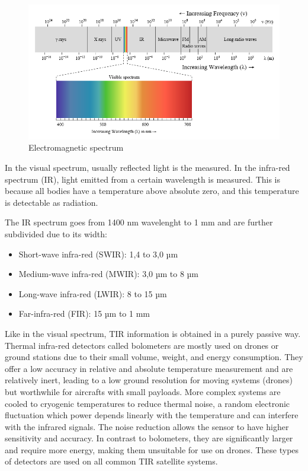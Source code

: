     \begin{figure}[H]
        \centering
        \includegraphics[width=\textwidth]{Includes/1-electromagnetic-spectrum.png}
        \caption{Electromagnetic spectrum}
        \label{fig:1-electromagnetic-spectrum}
    \end{figure}

    In the visual spectrum, usually reflected light is the measured. 
    In the infra-red spectrum (IR), light emitted from a certain wavelength is measured.
    This is because all bodies have a temperature above absolute zero, and this temperature is detectable as radiation.

    The IR spectrum goes from 1400 nm wavelenght to 1 mm and are further subdivided due to its width:


    \begin{itemize}
        \item  Short-wave infra-red (SWIR): 1,4 to 3,0 µm
        \item  Medium-wave infra-red (MWIR): 3,0 µm to 8 µm
        \item Long-wave infra-red (LWIR): 8 to 15 µm
        \item Far-infra-red (FIR): 15 µm to 1 mm
    \end{itemize}
    
    Like in the visual spectrum, TIR information is obtained in a purely passive way.
    Thermal infra-red detectors called bolometers are mostly used on drones or ground stations due to their small volume, weight, and energy consumption. 
    They offer a low accuracy in relative and absolute temperature measurement and are relatively inert, leading to a low ground resolution for moving systems (drones) but worthwhile for aircrafts with small payloads.     
    More complex systems are cooled to cryogenic temperatures to reduce thermal noise, a random electronic fluctuation which power depends linearly with the temperature and can interfere with the infrared signals. The noise reduction allows the sensor to have higher sensitivity and accuracy.
    In contrast to bolometers, they are significantly larger and require more energy, making them unsuitable for use on drones.
    These types of detectors are used on all common TIR satellite systems.

